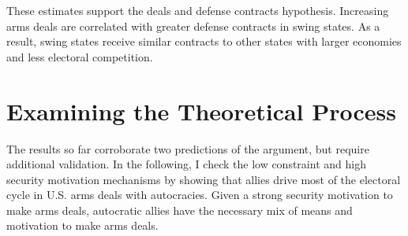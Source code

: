 \documentclass[12pt]{article}
\begin{document}
These estimates support the deals and defense contracts hypothesis. 
Increasing arms deals are correlated with greater defense contracts in swing states. 
As a result, swing states receive similar contracts to other states with larger economies and less electoral competition. 



%
%
%
%

%
%


\section{Examining the Theoretical Process}


The results so far corroborate two predictions of the argument, but require additional validation. 
In the following, I check the low constraint and high security motivation mechanisms by showing that allies drive most of the electoral cycle in U.S. arms deals with autocracies.  
Given a strong security motivation to make arms deals, autocratic allies have the necessary mix of means and motivation to make arms deals.
\end{document}
